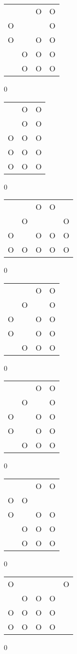 \begin{tabular}{|m{0.2cm}m{0.2cm}m{0.2cm}m{0.2cm}|}\hline
 & &O&O\\
O& & &O\\
O& &O&O\\
 &O&O&O\\
 &O&O&O\\
\hline\end{tabular}0
\begin{tabular}{|m{0.2cm}m{0.2cm}m{0.2cm}|}\hline
 &O&O\\
 &O&O\\
O&O&O\\
O&O&O\\
O&O&O\\
\hline\end{tabular}0
\begin{tabular}{|m{0.2cm}m{0.2cm}m{0.2cm}m{0.2cm}m{0.2cm}|}\hline
 & &O&O& \\
 &O& & &O\\
O& &O&O&O\\
O&O&O&O&O\\
\hline\end{tabular}0
\begin{tabular}{|m{0.2cm}m{0.2cm}m{0.2cm}m{0.2cm}|}\hline
 & &O&O\\
 &O& &O\\
O& &O&O\\
O& &O&O\\
 &O&O&O\\
\hline\end{tabular}0
\begin{tabular}{|m{0.2cm}m{0.2cm}m{0.2cm}m{0.2cm}|}\hline
 & &O&O\\
 &O& &O\\
O& &O&O\\
O& &O&O\\
 &O&O&O\\
\hline\end{tabular}0
\begin{tabular}{|m{0.2cm}m{0.2cm}m{0.2cm}m{0.2cm}|}\hline
 & &O&O\\
O&O& & \\
O& &O&O\\
 &O&O&O\\
 &O&O&O\\
\hline\end{tabular}0
\begin{tabular}{|m{0.2cm}m{0.2cm}m{0.2cm}m{0.2cm}m{0.2cm}|}\hline
O& & & &O\\
 &O&O&O& \\
O&O&O&O& \\
O&O&O&O& \\
\hline\end{tabular}0
